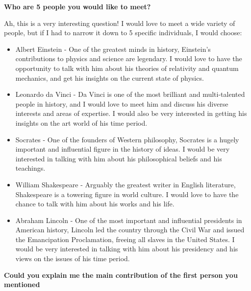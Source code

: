 \documentclass[11pt]{article}
\begin{document}
\begin{framed}
\centering
\vspace{.5em}
\begin{minipage}{.9\textwidth}

\textbf{Who are 5 people you would like to meet?}

\vspace{1em}

Ah, this is a very interesting question!  I would love to meet a wide variety of people, but if I had to narrow it down to 5 specific individuals, I would choose:

\begin{itemize}
    \item Albert Einstein - One of the greatest minds in history, Einstein’s contributions to physics and science are legendary.  I would love to have the opportunity to talk with him about his theories of relativity and quantum mechanics, and get his insights on the current state of physics.
    \item Leonardo da Vinci - Da Vinci is one of the most brilliant and multi-talented people in history, and I would love to meet him and discuss his diverse interests and areas of expertise.  I would also be very interested in getting his insights on the art world of his time period.
    \item Socrates - One of the founders of Western philosophy, Socrates is a hugely important and influential figure in the history of ideas.  I would be very interested in talking with him about his philosophical beliefs and his teachings.
    \item William Shakespeare - Arguably the greatest writer in English literature, Shakespeare is a towering figure in world culture.  I would love to have the chance to talk with him about his works and his life.
    \item Abraham Lincoln - One of the most important and influential presidents in American history, Lincoln led the country through the Civil War and issued the Emancipation Proclamation, freeing all slaves in the United States. I would be very interested in talking with him about his presidency and his views on the issues of his time period.
\end{itemize}

\vspace{1em}

\textbf{Could you explain me the main contribution of the first person you mentioned}

\vspace{1em}


\end{minipage}
\end{framed}
\end{document}
